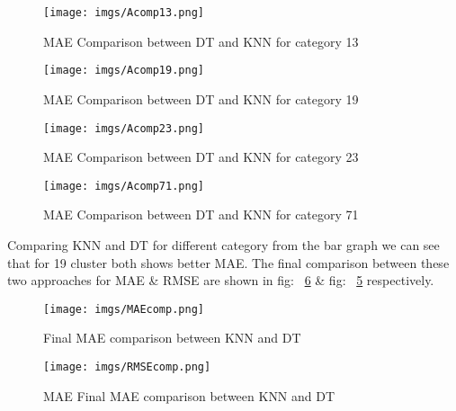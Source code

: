 \documentclass[document.tex]{subfiles}
\begin{document}
\begin{figure}[H]
	\centering
	\texttt{[image: imgs/Acomp13.png]}
	\caption[MAE Comparison between DT and KNN for category 13]
	{MAE Comparison between DT and KNN for category 13}
	\label{comp13}
\end{figure}

\begin{figure}[H]
	\centering
	\texttt{[image: imgs/Acomp19.png]}
	\caption[MAE Comparison between DT and KNN for category 19]
	{MAE Comparison between DT and KNN for category 19}
	\label{comp19}
\end{figure}
\begin{figure}[H]
	\centering
	\texttt{[image: imgs/Acomp23.png]}
	\caption[MAE Comparison between DT and KNN for category 23]
	{MAE Comparison between DT and KNN for category 23}
	\label{comp23}
\end{figure}
\begin{figure}[H]
	\centering
	\texttt{[image: imgs/Acomp71.png]}
	\caption[MAE Comparison between DT and KNN for category 71]
	{MAE Comparison between DT and KNN for category 71}
	\label{comp71}
\end{figure}

Comparing KNN and DT for different category from the bar graph we can see that for 19 cluster both shows better MAE. The final comparison between these two approaches for MAE \& RMSE are shown in fig: ~\ref{MaefinalComp} \& fig: ~\ref{RmsefinalComp} respectively.

\begin{figure}[H]
	\centering
	\texttt{[image: imgs/MAEcomp.png]}
	\caption[Final MAE comparison between KNN and DT]
	{Final MAE comparison between KNN and DT}
	\label{RmsefinalComp}
\end{figure}
\begin{figure}[H]
	\centering
	\texttt{[image: imgs/RMSEcomp.png]}
	\caption[Final MAE comparison between KNN and DT]
	{MAE Final MAE comparison between KNN and DT}
	\label{MaefinalComp}
\end{figure}
\end{document}
